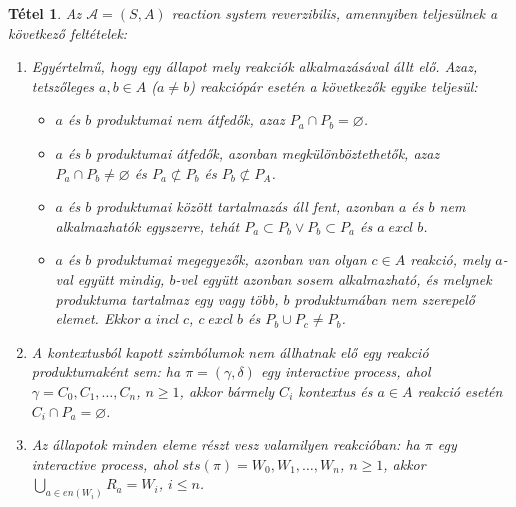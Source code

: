 \documentclass[12pt]{article}
\theoremstyle{definition}
\theoremstyle{remark}
\theoremstyle{plain}
\newtheorem*{theorem*}{Tétel}
\let\emptyset\varnothing
\newcommand{\excl}{\; \textit{excl} \;}
\newcommand{\incl}{\; \textit{incl} \;}
\begin{document}
    \begin{theorem*}
        Az $\mathscr{A} = (S, A)$ \textit{reaction system} reverzibilis, amennyiben teljesülnek a következő feltételek:
        \begin{enumerate}[label={(\arabic*)}]
            \item
            Egyértelmű, hogy egy állapot mely reakciók alkalmazásával állt elő. Azaz, tetszőleges $a, b \in A$ ($a \neq b$) reakciópár esetén a következők egyike teljesül:
            \begin{itemize}
                \item
                $a$ és $b$ produktumai nem átfedők, azaz $P_{a} \cap P_{b} = \emptyset$.

                \item
                $a$ és $b$ produktumai átfedők, azonban megkülönböztethetők, azaz $P_{a} \cap P_{b} \neq \emptyset$ és $P_{a} \not\subset P_{b}$ és $P_{b} \not\subset P_{A}$.

                \item
                $a$ és $b$ produktumai között tartalmazás áll fent, azonban $a$ és $b$ nem alkalmazhatók egyszerre, tehát $P_{a} \subset P_{b} \vee P_{b} \subset P_{a}$  és $a \excl b$.

                \item
                $a$ és $b$ produktumai megegyezők, azonban van olyan $c \in A$ reakció, mely $a$-val együtt mindig, $b$-vel együtt azonban sosem alkalmazható, és melynek produktuma tartalmaz egy vagy több, $b$ produktumában nem szerepelő elemet. Ekkor $a \incl c$, $c \excl b$ és $P_{b} \cup P_{c} \neq P_{b}$.
            \end{itemize} 

            \item
            A kontextusból kapott szimbólumok nem állhatnak elő egy reakció produktumaként sem: ha $\pi = (\gamma, \delta)$ egy \textit{interactive process}, ahol $\gamma = C_{0}, C_{1}, \ldots, C_{n}$, $n \geq 1$, akkor bármely $C_{i}$ kontextus és $a \in A$ reakció esetén $C_{i} \cap P_{a} = \emptyset$.

            \item
            Az állapotok minden eleme részt vesz valamilyen reakcióban: ha $\pi$ egy \textit{interactive process}, ahol $\textit{sts}(\pi) = W_{0}, W_{1}, \ldots, W_{n}$, $n \geq 1$, akkor $\bigcup_{a \in \textit{en}(W_{i})} R_{a} = W_{i}$, $i \leq n$.
        \end{enumerate}
    \end{theorem*}
\end{document}
